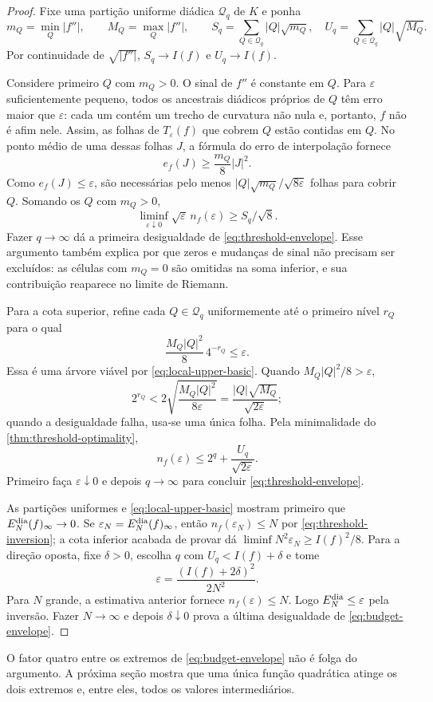 \begin{proof}
Fixe uma partição uniforme diádica $\mathcal Q_q$ de $K$ e ponha
\[
 m_Q=\min_Q|f''|,
 \qquad M_Q=\max_Q|f''|,
 \qquad
 S_q=\sum_{Q\in\mathcal Q_q}|Q|\sqrt{m_Q},
 \quad U_q=\sum_{Q\in\mathcal Q_q}|Q|\sqrt{M_Q}.
\]
Por continuidade de $\sqrt{|f''|}$, $S_q\to I(f)$ e $U_q\to I(f)$.

Considere primeiro $Q$ com $m_Q>0$. O sinal de $f''$ é constante em $Q$.
Para $\varepsilon$ suficientemente pequeno, todos os ancestrais diádicos
próprios de $Q$ têm erro maior que $\varepsilon$: cada um contém um trecho
de curvatura não nula e, portanto, $f$ não é afim nele. Assim, as folhas de
$T_\varepsilon(f)$ que cobrem $Q$ estão contidas em $Q$. No ponto médio de
uma dessas folhas $J$, a fórmula do erro de interpolação fornece
\[
 e_f(J)\ge \frac{m_Q}{8}|J|^2.
\]
Como $e_f(J)\le\varepsilon$, são necessárias pelo menos
$|Q|\sqrt{m_Q}/\sqrt{8\varepsilon}$ folhas para cobrir $Q$. Somando os
$Q$ com $m_Q>0$,
\[
 \liminf_{\varepsilon\downarrow0}
 \sqrt\varepsilon\,n_f(\varepsilon)\ge S_q/\sqrt8.
\]
Fazer $q\to\infty$ dá a primeira desigualdade de
\eqref{eq:threshold-envelope}. Esse argumento também explica por que zeros e
mudanças de sinal não precisam ser excluídos: as células com $m_Q=0$ são
omitidas na soma inferior, e sua contribuição reaparece no limite de Riemann.

Para a cota superior, refine cada $Q\in\mathcal Q_q$ uniformemente até o
primeiro nível $r_Q$ para o qual
\[
 \frac{M_Q|Q|^2}{8}\,4^{-r_Q}\le\varepsilon.
\]
Essa é uma árvore viável por \eqref{eq:local-upper-basic}. Quando
$M_Q|Q|^2/8>\varepsilon$,
\[
 2^{r_Q}<2\sqrt{\frac{M_Q|Q|^2}{8\varepsilon}}
 =\frac{|Q|\sqrt{M_Q}}{\sqrt{2\varepsilon}};
\]
quando a desigualdade falha, usa-se uma única folha. Pela minimalidade do
\cref{thm:threshold-optimality},
\[
 n_f(\varepsilon)
 \le 2^q+\frac{U_q}{\sqrt{2\varepsilon}}.
\]
Primeiro faça $\varepsilon\downarrow0$ e depois $q\to\infty$ para concluir
\eqref{eq:threshold-envelope}.

As partições uniformes e \eqref{eq:local-upper-basic} mostram primeiro que
$E_N^{\rm dia}(f)_\infty\to0$. Se
$\varepsilon_N=E_N^{\rm dia}(f)_\infty$, então
$n_f(\varepsilon_N)\le N$ por \eqref{eq:threshold-inversion}; a cota inferior
acabada de provar dá
$\liminf N^2\varepsilon_N\ge I(f)^2/8$. Para a direção oposta, fixe
$\delta>0$, escolha $q$ com $U_q<I(f)+\delta$ e tome
\[
 \varepsilon=\frac{(I(f)+2\delta)^2}{2N^2}.
\]
Para $N$ grande, a estimativa anterior fornece
$n_f(\varepsilon)\le N$. Logo $E_N^{\rm dia}\le\varepsilon$ pela inversão.
Fazer $N\to\infty$ e depois $\delta\downarrow0$ prova a última desigualdade
de \eqref{eq:budget-envelope}.
\end{proof}

O fator quatro entre os extremos de \eqref{eq:budget-envelope} não é folga
do argumento. A próxima seção mostra que uma única função quadrática atinge
os dois extremos e, entre eles, todos os valores intermediários.
